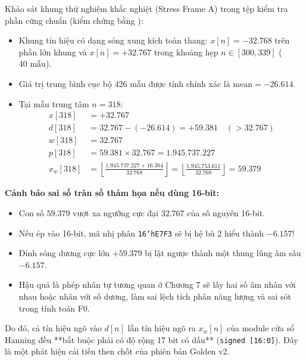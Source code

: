 Khảo sát khung thử nghiệm khắc nghiệt (Stress Frame A) trong tệp kiểm tra phần cứng chuẩn  (kiểm chứng bằng ):
\begin{itemize}[leftmargin=1.5em, itemsep=2pt]
    \item Khung tín hiệu có dạng sóng xung kích toàn thang: $x[n] = -32.768$ trên phần lớn khung và $x[n] = +32.767$ trong khoảng hẹp $n \in [300, 339]$ ($40\text{ mẫu}$).
    \item Giá trị trung bình cục bộ 426 mẫu được tính chính xác là $\text{mean} = -26.614$.
    \item Tại mẫu trung tâm $n = 318$:
    \begin{align}
    x[318] &= +32.767 \nonumber \\
    d[318] &= 32.767 - (-26.614) = \mathbf{+59.381} \quad (> 32.767) \nonumber \\
    w[318] &= 32.767 \nonumber \\
    p[318] &= 59.381 \times 32.767 = \mathbf{1.945.737.227} \nonumber \\
    x_w[318] &= \left\lfloor \frac{1.945.737.227 + 16.384}{32.768} \right\rfloor = \left\lfloor \frac{1.945.753.611}{32.768} \right\rfloor = \mathbf{59.379}
    \end{align}
\end{itemize}

\begin{costbox}
\textbf{Cảnh báo sai số tràn số thảm họa nếu dùng 16-bit:}
\begin{itemize}[leftmargin=1.5em, itemsep=2pt]
    \item Con số $59.379$ vượt xa ngưỡng cực đại $32.767$ của số nguyên 16-bit.
    \item Nếu ép vào 16-bit, mã nhị phân \texttt{16'hE7F3} sẽ bị hệ bù 2 hiểu thành $\mathbf{-6.157}$!
    \item Đỉnh sóng dương cực lớn $+59.379$ bị lật ngược thành một thung lũng âm sâu $-6.157$.
    \item Hậu quả là phép nhân tự tương quan ở Chương 7 sẽ lấy hai số âm nhân với nhau hoặc nhân với số dương, làm sai lệch tích phân năng lượng và sai sót trong tính toán F0.
\end{itemize}
\end{costbox}
Do đó, cả tín hiệu ngõ vào $d[n]$ lẫn tín hiệu ngõ ra $x_w[n]$ của module cửa sổ Hanning đều **bắt buộc phải có độ rộng 17 bit có dấu** (\texttt{signed [16:0]}). Đây là một phát hiện cải tiến then chốt của phiên bản Golden v2.

